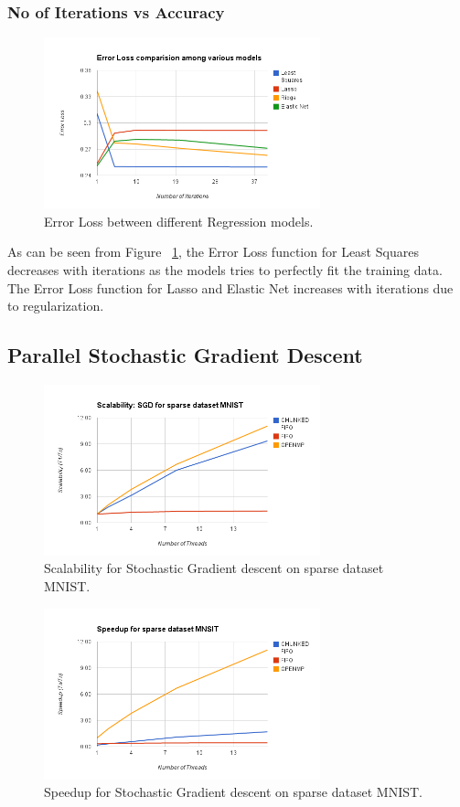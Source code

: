 \documentclass{sigplanconf}
\begin{document}
{   	\subsubsection{No of Iterations vs Accuracy}
    	
\begin{figure}[ht!]
\centering
\includegraphics[width=80mm]{error_loss1.png}
\caption{ Error Loss between different Regression models. }
\label{fig:fitting}
\end{figure}
	As can be seen from Figure ~\ref{fig:fitting}, the Error Loss function for Least Squares decreases with iterations as the models
	tries to perfectly fit the training data. The Error Loss function for Lasso and Elastic Net increases with iterations
	due to regularization.

\subsection{Parallel Stochastic Gradient Descent}
\begin{figure}[ht!]
\centering
\includegraphics[width=80mm]{sgd_scale_sparse.png}
\caption{Scalability for Stochastic Gradient descent on sparse dataset MNIST. }
\label{fig:sc_sgd_mnist}
\end{figure}


\begin{figure}[ht!]
\centering
\includegraphics[width=80mm]{sgd_speed_sparse.png}
\caption{Speedup for Stochastic Gradient descent on sparse dataset MNIST. }
\label{fig:sp_sgd_mnist}
\end{figure}

}
\end{document}
